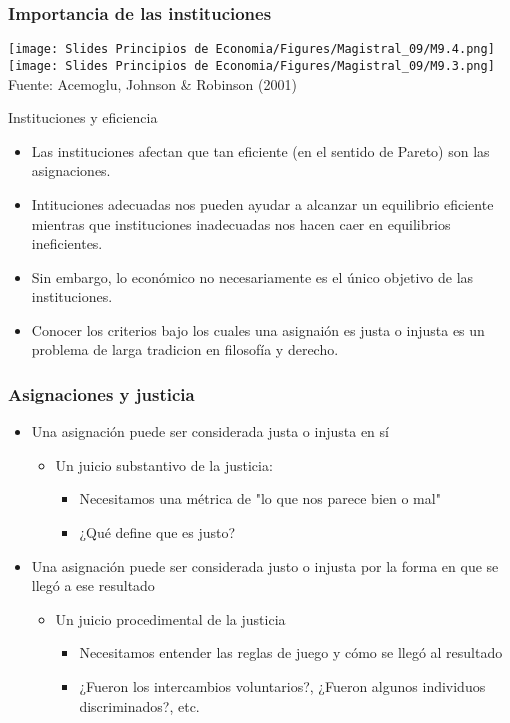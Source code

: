 \documentclass{beamer}
\begin{document}
\begin{frame}
\frametitle{Importancia de las instituciones}
\centering
\texttt{[image: Slides Principios de Economia/Figures/Magistral\_09/M9.4.png]} \vspace{2mm}
\texttt{[image: Slides Principios de Economia/Figures/Magistral\_09/M9.3.png]} \\ \vspace{2mm}
\small Fuente: Acemoglu, Johnson \& Robinson (2001)
\end{frame}

\begin{frame}{Instituciones y eficiencia}
    \begin{itemize}
        \item Las instituciones afectan que tan eficiente (en el sentido de Pareto) son las asignaciones.
        \item Intituciones adecuadas nos pueden ayudar a alcanzar un equilibrio eficiente mientras que instituciones inadecuadas nos hacen caer en equilibrios ineficientes.
        \item Sin embargo, lo económico no necesariamente es el único objetivo de las instituciones.
        \item Conocer los criterios bajo los cuales una asignaión es justa o injusta es un problema de larga tradicion en filosofía y derecho.
    \end{itemize}
\end{frame}

\begin{frame}
\frametitle{Asignaciones y justicia}
\begin{itemize}
    \item Una asignación puede ser considerada justa o injusta en sí
    \begin{itemize}
        \item Un juicio substantivo de la justicia:
        \begin{itemize}
            \item Necesitamos una métrica de "lo que nos parece bien o mal"
            \item ¿Qué define que es justo?
        \end{itemize}
    \end{itemize}
    \item  Una asignación puede ser considerada justo o  injusta por la forma en que se llegó a ese resultado\vspace{2mm}
    \begin{itemize}
        \item Un juicio procedimental de la justicia
        \begin{itemize} 
            \item Necesitamos entender las reglas de juego y cómo se llegó al resultado 
            \item ¿Fueron los intercambios voluntarios?, ¿Fueron algunos individuos discriminados?, etc.
        \end{itemize}
    \end{itemize}
\end{itemize}
\end{frame}
\end{document}
